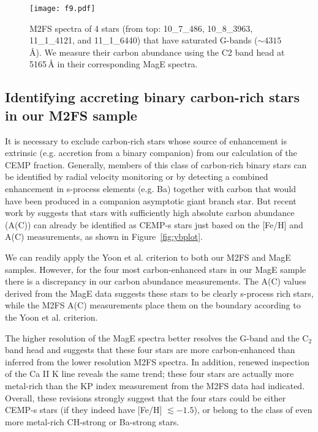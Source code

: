 \documentclass{emulateapj-rtx4}
\begin{document}

\begin{figure}[!t]
\centering
\texttt{[image: f9.pdf]}
\caption{M2FS spectra of 4 stars (from top: 10\_7\_486, 10\_8\_3963, 11\_1\_4121,
and 11\_1\_6440) that have saturated G-bands ($\sim4315$\,\AA). We measure their carbon abundance using the C2
band head at 5165\,\AA\,\,in their corresponding MagE spectra.}
\vspace{0.50cm}
\label{fig:cempspec}
\end{figure}


\subsection{Identifying accreting binary carbon-rich stars in our M2FS sample}
\label{sec:crich}
It is necessary to exclude carbon-rich stars whose  source of enhancement is extrinsic (e.g. accretion from a binary companion) from  our calculation of the CEMP fraction. 
Generally, members of this class of carbon-rich binary stars can be identified by radial velocity monitoring or by detecting a combined enhancement in s-process elements (e.g. Ba) together with carbon that would have been produced in a companion asymptotic giant branch star.
But recent work by \citet{ybp+16} suggests that stars with sufficiently high absolute carbon abundance (A(C))
can already be identified as CEMP-s stars just based on the [Fe/H] and A(C) measurements, as shown in Figure~\ref{fig:ybplot}.

We can readily apply the Yoon et al. criterion to both our M2FS and MagE samples. However, for the four most carbon-enhanced stars in our MagE sample there is a discrepancy in our carbon abundance measurements. The A(C) values derived from the MagE data suggests these stars to be  clearly s-process rich stars, while the M2FS A(C) measurements place them on the boundary according to the Yoon et al. criterion. 

The higher resolution of the MagE spectra better resolves the G-band and the C$_2$ band head and suggests that these four stars are more carbon-enhanced than inferred from the lower resolution M2FS spectra.
In addition, renewed inspection of the Ca II K line reveals the same trend; these four stars are actually more metal-rich than the KP index measurement from the M2FS data had indicated.
Overall, these revisions strongly suggest that the four stars could be either CEMP-s stars (if they indeed have [Fe/H] 
$\lesssim -1.5$), or belong to the class of even more metal-rich CH-strong or Ba-strong stars.
\end{document}
